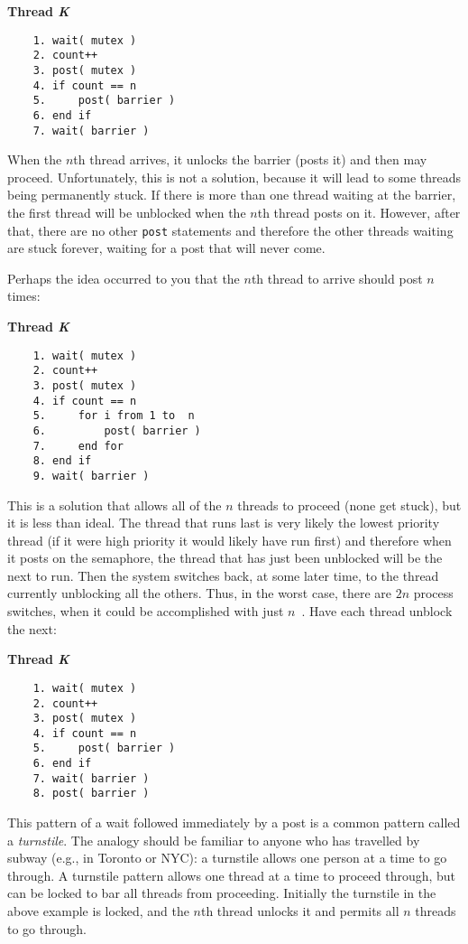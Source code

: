 \textbf{Thread \textit{K}}\vspace{-2em}
\begin{verbatim}
	1. wait( mutex )
	2. count++
	3. post( mutex )
	4. if count == n
	5.     post( barrier )
	6. end if
	7. wait( barrier )
  \end{verbatim}
\vspace{-2em}

When the $n$th thread arrives, it unlocks the barrier (posts it) and then may proceed. Unfortunately, this is not a solution, because it will lead to some threads being permanently stuck. If there is more than one thread waiting at the barrier, the first thread will be unblocked when the $n$th thread posts on it. However, after that, there are no other \texttt{post} statements and therefore the other threads waiting are stuck forever, waiting for a post that will never come.

Perhaps the idea occurred to you that the $n$th thread to arrive should post $n$ times:

\textbf{Thread \textit{K}}\vspace{-2em}
\begin{verbatim}
	1. wait( mutex )
	2. count++
	3. post( mutex )
	4. if count == n
	5.     for i from 1 to  n
	6.         post( barrier )
	7.     end for
	8. end if
	9. wait( barrier )
  \end{verbatim}
\vspace{-2em}

This is a solution that allows all of the $n$ threads to proceed (none get stuck), but it is less than ideal. The thread that runs last is very likely the lowest priority thread (if it were high priority it would likely have run first) and therefore when it posts on the semaphore, the thread that has just been unblocked will be the next to run. Then the system switches back, at some later time, to the thread currently unblocking all the others. Thus, in the worst case, there are $2n$ process switches, when it could be accomplished with just $n$~\cite{mte241}. Have each thread unblock the next:

\textbf{Thread \textit{K}}\vspace{-2em}
\begin{verbatim}
	1. wait( mutex )
	2. count++
	3. post( mutex )
	4. if count == n
	5.     post( barrier )
	6. end if
	7. wait( barrier )
	8. post( barrier )
  \end{verbatim}
\vspace{-2em}

This pattern of a wait followed immediately by a post is a common pattern called a \textit{turnstile}. The analogy should be familiar to anyone who has travelled by subway (e.g., in Toronto or NYC): a turnstile allows one person at a time to go through. A turnstile pattern allows one thread at a time to proceed through, but can be locked to bar all threads from proceeding. Initially the turnstile in the above example is locked, and the $n$th thread unlocks it and permits all $n$ threads to go through.

